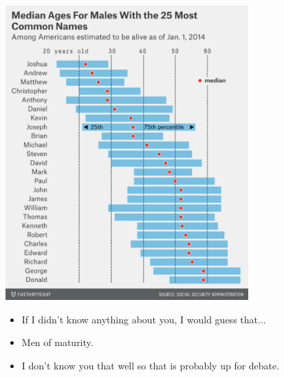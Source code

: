 \documentclass[slidestop,compress,mathserif,12pt,t,professionalfonts,xcolor=table]{beamer}
\begin{document}
\begin{frame}
{}

\end{frame}


\begin{frame}
\frametitle{}

\vspace{-0.45cm}

\begin{center}
\includegraphics[width=0.7\textwidth]{figures/silver-feature-most-common-men-names5.png}
\end{center}

  \begin{itemize}
  \item If I didn't know anything about you, I would guess that...
  \item Men of maturity.  
  \item I don't know you that well so that is probably up for debate.
  \end{itemize}

\end{frame}

\end{document}

